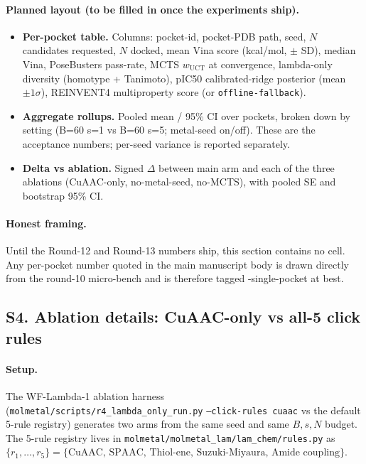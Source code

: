 \paragraph{Planned layout (to be filled in once the experiments ship).}
\begin{itemize}
  \item \textbf{Per-pocket table.}  Columns: pocket-id, pocket-PDB path,
        seed, $N$ candidates requested, $N$ docked, mean Vina score
        (kcal/mol, $\pm$ SD), median Vina, PoseBusters pass-rate, MCTS
        $w_{\text{UCT}}$ at convergence, lambda-only diversity
        (homotype + Tanimoto), pIC50 calibrated-ridge posterior
        (mean $\pm 1\sigma$), REINVENT4 multiproperty score (or
        \texttt{offline-fallback}).
  \item \textbf{Aggregate rollups.}  Pooled mean / 95\% CI over
        pockets, broken down by setting
        (B=60 s=1 vs B=60 s=5; metal-seed on/off).  These are the
        acceptance numbers; per-seed variance is reported separately.
  \item \textbf{Delta vs ablation.}  Signed $\Delta$ between main arm
        and each of the three ablations (CuAAC-only, no-metal-seed,
        no-MCTS), with pooled SE and bootstrap 95\% CI.
\end{itemize}

\paragraph{Honest framing.}
Until the Round-12 and Round-13 numbers ship, this section contains no
\MEASURED{} cell.  Any per-pocket number quoted in the main manuscript
body is drawn directly from the round-10 micro-bench
\cite{footnote:round10_e2e} and is therefore tagged
\MEASURED{}-single-pocket at best.


\subsection*{S4. Ablation details: CuAAC-only vs all-5 click rules}
\label{supp:s4-ablation}

\paragraph{Setup.}
The WF-Lambda-1 ablation harness
(\texttt{molmetal/scripts/r4\_lambda\_only\_run.py}
\texttt{--click-rules cuaac} vs the default 5-rule registry)
generates two arms from the same seed and same $B, s, N$ budget.  The
5-rule registry lives in
\texttt{molmetal/molmetal\_lam/lam\_chem/rules.py} as
$\{r_1, \dots, r_5\} = \{\text{CuAAC, SPAAC, Thiol-ene, Suzuki-Miyaura,
Amide coupling}\}$.

